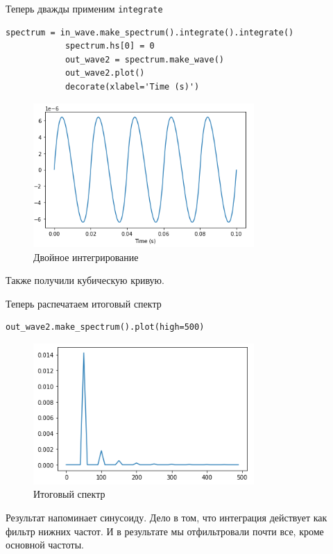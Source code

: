 \documentclass[a4paper,12pt]{article}
\begin{document}
\begin{enumerate}
		Теперь дважды применим \texttt{integrate}
		\begin{lstlisting}[caption=Двойное интегрирование]
			spectrum = in_wave.make_spectrum().integrate().integrate()
			spectrum.hs[0] = 0
			out_wave2 = spectrum.make_wave()
			out_wave2.plot()
			decorate(xlabel='Time (s)')
		\end{lstlisting}
		\begin{figure}[H]
			\centering
			\includegraphics[width=0.75\textwidth]{4_4.png}
			\caption{Двойное интегрирование}
			\label{fig:4.4}
		\end{figure}
	
		Также получили кубическую кривую.
		
		Теперь распечатаем итоговый спектр
		\begin{lstlisting}[caption=Итоговый спектр]
			out_wave2.make_spectrum().plot(high=500)
		\end{lstlisting}
		\begin{figure}[H]
			\centering
			\includegraphics[width=0.75\textwidth]{4_5.png}
			\caption{Итоговый спектр}
			\label{fig:4.5}
		\end{figure}
	
		Результат напоминает синусоиду. Дело в том, что интеграция действует как фильтр нижних частот. И в результате мы отфильтровали почти все, кроме основной частоты.
		
	\end{enumerate}
	\newpage
	
\end{document}
